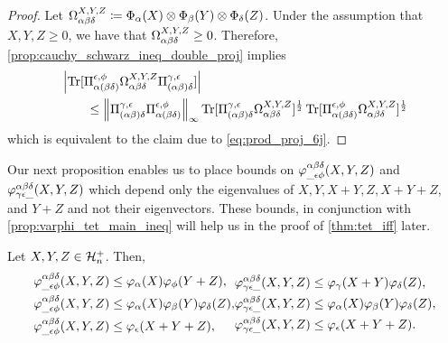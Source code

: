 \documentclass[notitlepage, 11pt, letterpaper]{amsart}
\begin{document}
\begin{proof}
    Let $\Omega_{\alpha\beta\delta}^{X,Y,Z} \coloneqq \Phi_{\alpha}(X)\otimes\Phi_{\beta}(Y)\otimes\Phi_{\delta}(Z)$.
    Under the assumption that $X,Y,Z \geq 0$, we have that $\Omega_{\alpha\beta\delta}^{X,Y,Z} \geq 0$.
    Therefore, \cref{prop:cauchy_schwarz_ineq_double_proj} implies
    \begin{align}
        \begin{split}
            &\left|\operatorname{Tr}[\Pi_{\alpha (\beta \delta)}^{\epsilon, \phi}\Omega_{\alpha\beta\delta}^{X,Y,Z}\Pi_{(\alpha \beta) \delta}^{\gamma, \epsilon}]\right| \\
            &\qquad\leq \left\lVert\Pi_{(\alpha \beta) \delta}^{\gamma, \epsilon} \Pi_{\alpha (\beta \delta)}^{\epsilon, \phi}\right\rVert_{\infty} \operatorname{Tr}[\Pi_{(\alpha \beta) \delta}^{\gamma, \epsilon} \Omega_{\alpha\beta\delta}^{X,Y,Z}]^{\frac{1}{2}}\operatorname{Tr}[\Pi_{\alpha (\beta \delta)}^{\epsilon, \phi} \Omega_{\alpha\beta\delta}^{X,Y,Z}]^{\frac{1}{2}}
        \end{split}
    \end{align}
    which is equivalent to the claim due to \cref{eq:prod_proj_6j}.
\end{proof}
Our next proposition enables us to place bounds on $\varphi^{\alpha\beta\delta}_{\_\epsilon\phi}(X,Y,Z)$ and $\varphi^{\alpha\beta\delta}_{\gamma\epsilon\_}(X,Y,Z)$ which depend only the eigenvalues of $X,Y,X+Y,Z,X+Y+Z$, and $Y+Z$ and not their eigenvectors.
These bounds, in conjunction with \cref{prop:varphi_tet_main_ineq} will help us in the proof of \cref{thm:tet_iff} later.
\begin{prop}
    \label{prop:tet_psum_ineq}
    Let $X,Y,Z \in \mathcal H^{+}_{n}$.
    Then,
    \begin{align}
        \label{eq:psum_prod_bounds}
        \begin{split}
            \varphi^{\alpha\beta\delta}_{\_\epsilon\phi}(X,Y,Z) &\leq \varphi_{\alpha}(X)\varphi_{\phi}(Y+Z),\\
            \varphi^{\alpha\beta\delta}_{\_\epsilon\phi}(X,Y,Z) &\leq \varphi_{\alpha}(X)\varphi_{\beta}(Y)\varphi_{\delta}(Z),\\
            \varphi^{\alpha\beta\delta}_{\_\epsilon\phi}(X,Y,Z) &\leq \varphi_{\epsilon}(X+Y+Z),
        \end{split}
        \begin{split}
            \varphi^{\alpha\beta\delta}_{\gamma\epsilon\_}(X,Y,Z) &\leq \varphi_{\gamma}(X+Y)\varphi_{\delta}(Z),\\
            \varphi^{\alpha\beta\delta}_{\gamma\epsilon\_}(X,Y,Z) &\leq \varphi_{\alpha}(X)\varphi_{\beta}(Y)\varphi_{\delta}(Z),\\
            \varphi^{\alpha\beta\delta}_{\gamma\epsilon\_}(X,Y,Z) &\leq \varphi_{\epsilon}(X+Y+Z).
        \end{split}
    \end{align}
\end{prop}
\end{document}
